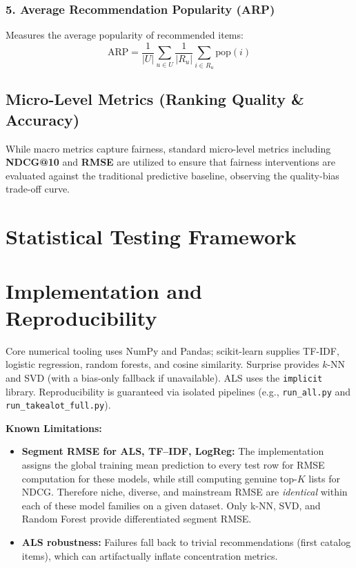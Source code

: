 \documentclass[11pt,a4paper]{report}
\begin{document}
\subsubsection*{5. Average Recommendation Popularity (ARP)}
Measures the average popularity of recommended items:
\begin{equation}
\textrm{ARP} = \frac{1}{|U|}\sum_{u \in U} \frac{1}{|R_u|}\sum_{i \in R_u} \textrm{pop}(i)
\end{equation}

\subsection{Micro-Level Metrics (Ranking Quality \& Accuracy)}
While macro metrics capture fairness, standard micro-level metrics including \textbf{NDCG@10} and \textbf{RMSE} are utilized to ensure that fairness interventions are evaluated against the traditional predictive baseline, observing the quality-bias trade-off curve.

\section{Statistical Testing Framework}

\section{Implementation and Reproducibility}
Core numerical tooling uses NumPy and Pandas; scikit-learn supplies TF-IDF, logistic regression, random forests, and cosine similarity. Surprise provides $k$-NN and SVD (with a bias-only fallback if unavailable). ALS uses the \texttt{implicit} library. Reproducibility is guaranteed via isolated pipelines (e.g., \texttt{run\_all.py} and \texttt{run\_takealot\_full.py}). 

\textbf{Known Limitations:}
\begin{itemize}
    \item \textbf{Segment RMSE for ALS, TF--IDF, LogReg:} The implementation assigns the global training mean prediction to every test row for RMSE computation for these models, while still computing genuine top-$K$ lists for NDCG. Therefore niche, diverse, and mainstream RMSE are \emph{identical} within each of these model families on a given dataset. Only k-NN, SVD, and Random Forest provide differentiated segment RMSE.
    \item \textbf{ALS robustness:} Failures fall back to trivial recommendations (first catalog items), which can artifactually inflate concentration metrics.
\end{itemize}
\end{document}
